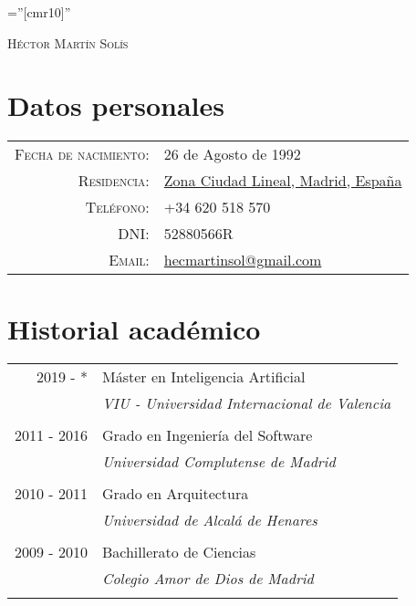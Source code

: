 \documentclass[a4paper,10pt]{article}
\begin{document}
\pagestyle{empty} %

\font\fb=''[cmr10]'' %

\par{\centering
		{\Huge \textsc{Héctor Martín Solís}
	}\bigskip\par}

\section{Datos personales}

\begin{tabular}{rl}
    \textsc{Fecha de nacimiento:} & 26 de Agosto de 1992 \\
    \textsc{Residencia:}   & \href{https://goo.gl/maps/dTcRVe9CrJS2}{Zona Ciudad Lineal, Madrid, España} \\
    \textsc{Teléfono:}     & +34 620 518 570\\
    \textsc{DNI:}     & 52880566R\\
    \textsc{Email:}     & \href{mailto:hecmartinsol@gmail.com}{hecmartinsol@gmail.com}
\end{tabular}

\section{Historial académico}
\begin{tabular}{rl}	
	\textsc{2019 - *}& Máster en Inteligencia Artificial\\&
	\small\emph{VIU - Universidad Internacional de Valencia}\\&\\
	
	\textsc{2011 - 2016}& Grado en Ingeniería del Software\\&
	\small\emph{Universidad Complutense de Madrid}\\&\\

	\textsc{2010 - 2011}& Grado en Arquitectura\\&
	\small\emph{Universidad de Alcalá de Henares}\\&\\

	\textsc{2009 - 2010}& Bachillerato de Ciencias\\&
	\small\emph{Colegio Amor de Dios de Madrid}\\&\\
\end{tabular}
\end{document}
